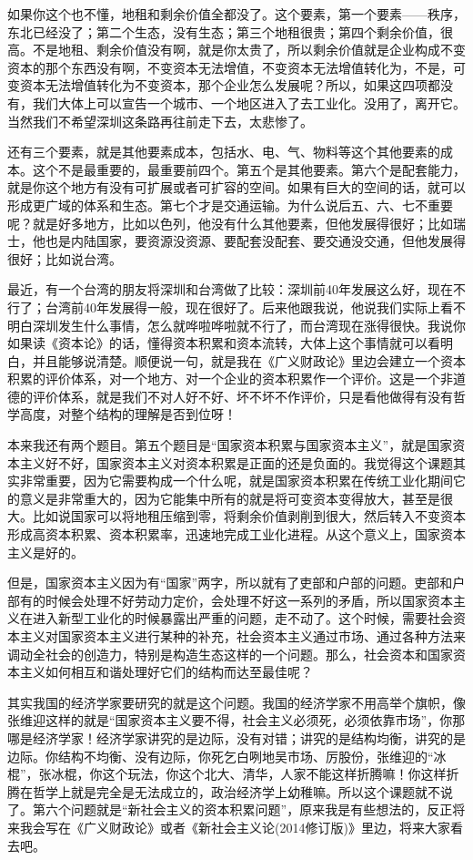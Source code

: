 \documentclass[UTF8, 12pt, a4paper]{ctexrep}
\begin{document}
如果你这个也不懂，地租和剩余价值全都没了。这个要素，第一个要素——秩序，东北已经没了；第二个生态，没有生态；第三个地租很贵；第四个剩余价值，很高。不是地租、剩余价值没有啊，就是你太贵了，所以剩余价值就是企业构成不变资本的那个东西没有啊，不变资本无法增值，不变资本无法增值转化为，不是，可变资本无法增值转化为不变资本，那个企业怎么发展呢？所以，如果这四项都没有，我们大体上可以宣告一个城市、一个地区进入了去工业化。没用了，离开它。当然我们不希望深圳这条路再往前走下去，太悲惨了。

还有三个要素，就是其他要素成本，包括水、电、气、物料等这个其他要素的成本。这个不是最重要的，最重要前四个。第五个是其他要素。第六个是配套能力，就是你这个地方有没有可扩展或者可扩容的空间。如果有巨大的空间的话，就可以形成更广域的体系和生态。第七个才是交通运输。为什么说后五、六、七不重要呢？就是好多地方，比如以色列，他没有什么其他要素，但他发展得很好；比如瑞士，他也是内陆国家，要资源没资源、要配套没配套、要交通没交通，但他发展得很好；比如说台湾。

最近，有一个台湾的朋友将深圳和台湾做了比较：深圳前40年发展这么好，现在不行了；台湾前40年发展得一般，现在很好了。后来他跟我说，他说我们实际上看不明白深圳发生什么事情，怎么就哗啦哗啦就不行了，而台湾现在涨得很快。我说你如果读《资本论》的话，懂得资本积累和资本流转，大体上这个事情就可以看明白，并且能够说清楚。顺便说一句，就是我在《广义财政论》里边会建立一个资本积累的评价体系，对一个地方、对一个企业的资本积累作一个评价。这是一个非道德的评价体系，就是我们不对人好不好、坏不坏不作评价，只是看他做得有没有哲学高度，对整个结构的理解是否到位呀！

本来我还有两个题目。第五个题目是“国家资本积累与国家资本主义”，就是国家资本主义好不好，国家资本主义对资本积累是正面的还是负面的。我觉得这个课题其实非常重要，因为它需要构成一个什么呢，就是国家资本积累在传统工业化期间它的意义是非常重大的，因为它能集中所有的就是将可变资本变得放大，甚至是很大。比如说国家可以将地租压缩到零，将剩余价值剥削到很大，然后转入不变资本形成高资本积累、资本积累率，迅速地完成工业化进程。从这个意义上，国家资本主义是好的。

但是，国家资本主义因为有“国家”两字，所以就有了吏部和户部的问题。吏部和户部有的时候会处理不好劳动力定价，会处理不好这一系列的矛盾，所以国家资本主义在进入新型工业化的时候暴露出严重的问题，走不动了。这个时候，需要社会资本主义对国家资本主义进行某种的补充，社会资本主义通过市场、通过各种方法来调动全社会的创造力，特别是构造生态这样的一个问题。那么，社会资本和国家资本主义如何相互和谐处理好它们的结构而达至最佳呢？

其实我国的经济学家要研究的就是这个问题。我国的经济学家不用高举个旗帜，像张维迎这样的就是“国家资本主义要不得，社会主义必须死，必须依靠市场”，你那哪是经济学家！经济学家讲究的是边际，没有对错；讲究的是结构均衡，讲究的是边际。你结构不均衡、没有边际，你死乞白咧地吴市场、厉股份，张维迎的“冰棍”，张冰棍，你这个玩法，你这个北大、清华，人家不能这样折腾嘛！你这样折腾在哲学上就是完全是无法成立的，政治经济学上幼稚嘛。所以这个课题就不说了。第六个问题就是“新社会主义的资本积累问题”，原来我是有些想法的，反正将来我会写在《广义财政论》或者《新社会主义论(2014修订版)》里边，将来大家看去吧。
\end{document}
